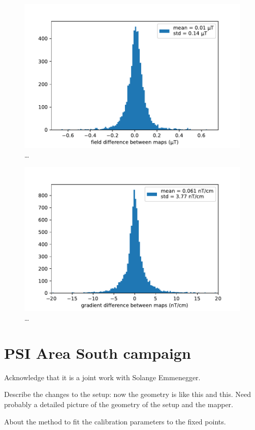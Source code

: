 \begin{figure}
  \centering
  \includegraphics[width=0.9\linewidth]{gfx/mapping/lpsc/reproducibility_field.pdf}
  \caption{\ldots}
  \label{fig:mapping_bastille_magnitude}
\end{figure}

\begin{figure}
  \centering
  \includegraphics[width=0.9\linewidth]{gfx/mapping/lpsc/reproducibility_gradient.pdf}
  \caption{\ldots}
  \label{fig:mapping_bastille_magnitude}
\end{figure}



\section{PSI Area South campaign}

Acknowledge that it is a joint work with Solange Emmenegger.

Describe the changes to the setup: now the geometry is like this and this. Need probably a detailed picture of the geometry of the setup and the mapper.

About the method to fit the calibration parameters to the fixed points.
